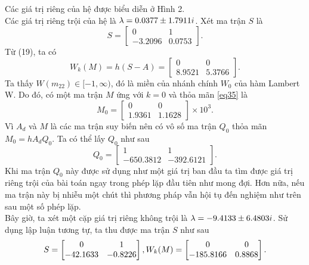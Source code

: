 Các giá trị riêng của hệ được biểu diễn ở Hình 2.\\
Các giá trị riêng trội của hệ là $\lambda = 0.0377 \pm 1.7911i$. Xét ma trận $S$ là
\begin{equation}\label{eq34}
	S= \begin{bmatrix}
		0 & 1 \\ -3.2096 & 0.0753
	\end{bmatrix}.
\end{equation}
Từ (19), ta có
\begin{equation}\label{eq35}
	W_k(M) = h  (S-A) = \begin{bmatrix}
		0 & 0 \\ 8.9521 & 5.3766
	\end{bmatrix}.
\end{equation}
Ta thấy $W(m_{22}) \in [-1, \infty)$, đó là miền của nhánh chính $W_0$ của hàm Lambert W. Do đó, có một ma trận $M$ ứng với $k =0$ và thỏa mãn \eqref{eq35} là
\begin{equation}\label{eq36}
	M_0 = \begin{bmatrix}
		0 & 0\\ 1.9361 &1.1628
	\end{bmatrix} \times 10^3 .
\end{equation}
Vì $A_d$ và $M$ là các ma trận suy biến nên có vô số ma trận $Q_0$ thỏa mãn $M_0 = h  A_d Q_0$. Ta có thể lấy $Q_0$ như sau
\begin{equation}\label{eq37}
	Q_0 = \begin{bmatrix}
		1 & 1\\ -650.3812 &-392.6121
	\end{bmatrix} .
\end{equation}
Khi ma trận $Q_0$ này được sử dụng như một giá trị ban đầu ta tìm được giá trị riêng trội của bài toán ngay trong phép lặp đầu tiên như mong đợi. Hơn nữa, nếu ma trận này bị nhiễu một chút thì phương pháp vẫn hội tụ đến nghiệm như trên sau một số phép lặp.\\
Bây giờ, ta xét một cặp giá trị riêng không trội là $\lambda = -9.4133 \pm 6.4803i$. Sử dụng lập luận tương tự, ta thu được ma trận $S$ như sau
\begin{equation}\label{eq38}
	S=\begin{bmatrix}
		0&1\\-42.1633 & -0.8226
	\end{bmatrix},\\
	W_k(M)=\begin{bmatrix}
		0 & 0\\ -185.8166 & 0.8868
	\end{bmatrix}.
\end{equation}
